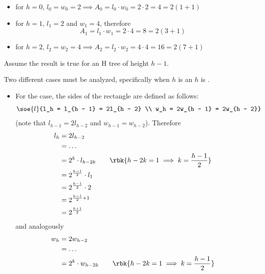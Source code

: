 \documentclass[a4paper, 12pt]{report}
\begin{document}
{        \begin{itemize}
            \item for $h = 0$, $l_0 = w_0 = 2 \implies A_0 = l_0 \cdot w_0 = 2 \cdot 2 = 4 = 2(1+1)$ 
            \item for $h = 1$, $l_1 = 2$ and $w_1 = 4$, therefore $$A_1 = l_1 \cdot w_1 = 2 \cdot 4 = 8 = 2(3+1)$$
            \item for $h = 2$, $l_2 = w_2 = 4 \implies A_2 = l_2 \cdot w_2 = 4 \cdot 4 = 16 = 2(7+1)$
        \end{itemize}
    }{
        Assume the result is true for an H tree of height $h - 1$.
    }{
        Two different cases must be analyzed, specifically when $h$ is  an $h$ is .
        
        \begin{itemize}
            \item For the  case, the sides of the rectangle are defined as follows: $$\soe{l}{l_h = l_{h - 1} = 2l_{h - 2} \\ w_h = 2w_{h - 1} = 2w_{h - 2}}$$ (note that $l_{h - 1} = 2l_{h - 2}$ and $w_{h - 1} = w_{h - 2}$). Therefore
                \begin{equation*}
                    \begin{split}
                        l_h &= 2l_{h-2} \\
                            &= \ldots \\
                            &= 2^k \cdot l_{h - 2k} \quad \quad \rbk{h - 2k = 1 \implies k = \frac{h - 1}{2}} \\
                            &= 2^\frac{h - 1}{2} \cdot l_1 \\
                            &= 2^\frac{h - 1}{2} \cdot 2 \\
                            &= 2^{\frac{h - 1}{2} + 1} \\
                            &= 2^\frac{h + 1}{2}
                    \end{split}
                \end{equation*}
                and analogously
                \begin{equation*}
                    \begin{split}
                        w_h &= 2w_{h - 2} \\
                            &= \ldots \\
                            &= 2^k \cdot w_{h - 2k} \quad \quad \rbk{h - 2k = 1 \implies k = \frac{h - 1}{2}} \\

\end{split}
\end{equation*}
\end{itemize}}
\end{document}
